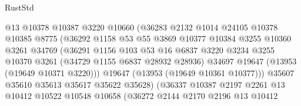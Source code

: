 \begin{lexlean}{RustStd}
\begin{coremodule}
                                @13
                                @10378
                                @10387
                                @3220
                                @10660
                                (@36283
                                  @2132
                                  @1014
                                  @24105
                                  @10378
                                  @10385
                                  @8775
                                  (@36292
                                    @1158
                                    @53
                                    @55
                                    @3869
                                    @10377
                                    @10384
                                    @3255
                                    @10360
                                    @3261
                                    @34769
                                    (@36291
                                      @1156
                                      @103
                                      @53
                                      @16
                                      @6837
                                      @3220
                                      @3234
                                      @3255
                                      @10370
                                      @3261
                                      (@34729 @1155 @6837 @28932 @28936)
                                      @34697
                                      @19647
                                      (@13953 (@19649 @10371 @3220)))
                                    @19647
                                    (@13953 (@19649 @10361 @10377)))
                                  @35607
                                  @35610
                                  @35613
                                  @35617
                                  @35622
                                  @35628)
                                (@36337
                                  @10387
                                  @2197
                                  @2261
                                  @13
                                  @10412
                                  @10522
                                  @10548
                                  @10658
                                  (@36272
                                    @2144
                                    @2170
                                    @2196
                                    @13
                                    @10412

\end{coremodule}
\end{lexlean}
